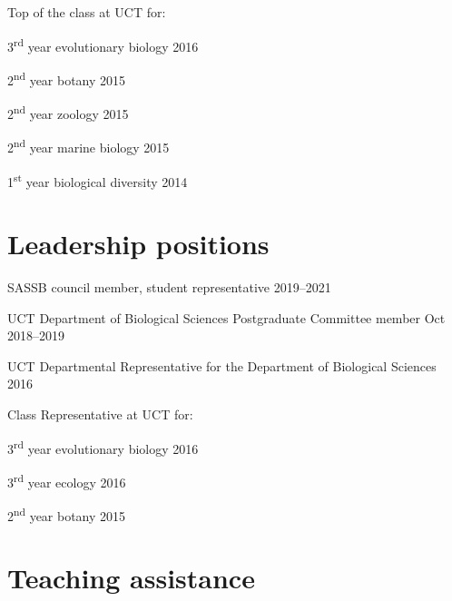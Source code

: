 \documentclass[10pt]{article}
\begin{document}
Top of the class at UCT for:

\hspace{2em} 3\textsuperscript{rd} year evolutionary biology         \hfill 2016

\hspace{2em} 2\textsuperscript{nd} year botany                       \hfill 2015 

\hspace{2em} 2\textsuperscript{nd} year zoology                      \hfill 2015

\hspace{2em} 2\textsuperscript{nd} year marine biology               \hfill 2015

\hspace{2em} 1\textsuperscript{st} year biological diversity         \hfill 2014

\section*{Leadership positions} %

SASSB council member, student representative                   \hfill 2019--2021

UCT Department of Biological Sciences Postgraduate Committee member
                                                           \hfill Oct 2018--2019

UCT Departmental Representative for the Department of Biological Sciences
                                                                     \hfill 2016

Class Representative at UCT for:

\hspace{2em} 3\textsuperscript{rd} year evolutionary biology         \hfill 2016

\hspace{2em} 3\textsuperscript{rd} year ecology                      \hfill 2016

\hspace{2em} 2\textsuperscript{nd} year botany                       \hfill 2015

\clearpage %

\section*{Teaching assistance} %
\end{document}
